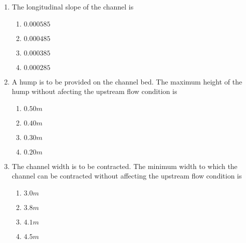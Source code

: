 \documentclass[journal]{IEEEtran}
\begin{document}
\begin{enumerate}
            \item \label{71} The longitudinal slope of the channel is
                \begin{enumerate}
                    \item $0.000585$
                    \item $0.000485$
                    \item $0.000385$
                    \item $0.000285$
                \end{enumerate}
            \item \label{72}  A hump is to be provided on the channel bed. The maximum height of the hump without afecting the upstream flow condition is
                \begin{enumerate}
                    \item $0.50m$
                    \item $0.40m$
                    \item $0.30m$
                    \item $0.20m$
                \end{enumerate}

            \item \label{73} The channel width is to be contracted. The minimum width to which the channel can be contracted without affecting the upstream flow condition is
                \begin{enumerate}
                    \item $3.0m$
                    \item $3.8m$
                    \item $4.1m$
                    \item $4.5m$
                \end{enumerate}


\end{enumerate}
\end{document}
